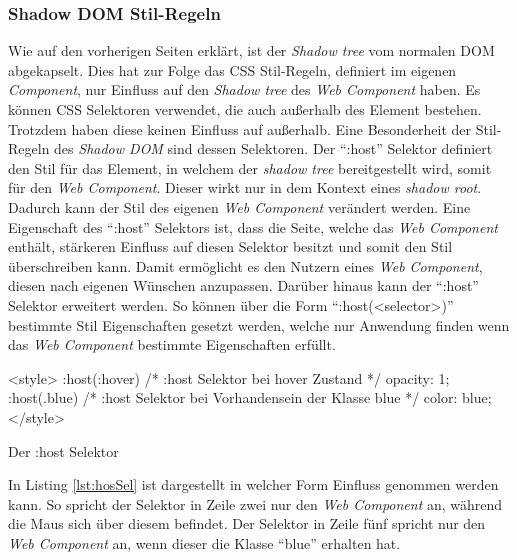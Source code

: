 \documentclass[12pt, paper=a4, bibtotoc, toc=listof, headsepline=true]{scrreprt}
\begin{document}
		\subsubsection{Shadow DOM Stil-Regeln}
		Wie auf den vorherigen Seiten erklärt, ist der \emph{Shadow tree} vom normalen \ac{DOM} abgekapselt. Dies hat zur Folge das \ac{CSS} Stil-Regeln, definiert im eigenen \emph{Component}, nur Einfluss auf den \emph{Shadow tree} des \emph{Web Component} haben. Es können \ac{CSS} Selektoren verwendet, die auch außerhalb des Element bestehen. Trotzdem haben diese keinen Einfluss auf außerhalb. \newline
		Eine Besonderheit der Stil-Regeln des \emph{Shadow DOM} sind dessen Selektoren. Der \enquote{:host} Selektor definiert den Stil für das Element, in welchem der \emph{shadow tree} bereitgestellt wird, somit für den \emph{Web Component}. Dieser wirkt nur in dem Kontext eines \emph{shadow root}. Dadurch kann der Stil des eigenen \emph{Web Component} verändert werden. Eine Eigenschaft des \enquote{:host} Selektors ist, dass die Seite, welche das \emph{Web Component} enthält, stärkeren Einfluss auf diesen Selektor besitzt und somit den Stil überschreiben kann. Damit ermöglicht es den Nutzern eines \emph{Web Component}, diesen nach eigenen Wünschen anzupassen. Darüber hinaus kann der \enquote{:host} Selektor erweitert werden. So können über die Form \enquote{:host(<selector>)} bestimmte Stil Eigenschaften gesetzt werden, welche nur Anwendung finden wenn das \emph{Web Component} bestimmte Eigenschaften erfüllt. 
		\begin{listing}
		\begin{HTMLcode*}{}
<style>		
:host(:hover) { /* :host Selektor bei hover Zustand */
   opacity: 1;
}
:host(.blue) { /* :host Selektor bei Vorhandensein der Klasse blue */
   color: blue;
}
</style>
		\end{HTMLcode*}
		\caption{Der :host Selektor}
		\label{lst:hosSel}
		\end{listing}
		In Listing \ref{lst:hosSel} ist dargestellt in welcher Form Einfluss genommen werden kann. So spricht der Selektor in Zeile zwei nur den \emph{Web Component} an, während die Maus sich über diesem befindet. Der Selektor in Zeile fünf spricht nur den \emph{Web Component} an, wenn dieser die Klasse \enquote{blue} erhalten hat.
\end{document}
